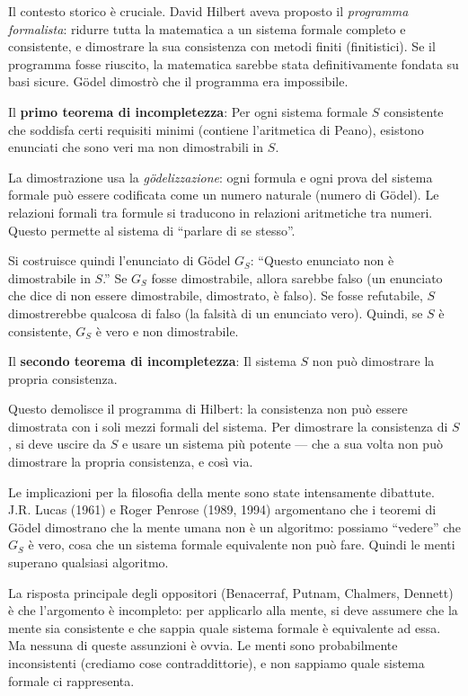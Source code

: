 \documentclass[11.5pt,a4paper,openany]{book}
\theoremstyle{remark}
\begin{document}
Il contesto storico è cruciale. David Hilbert aveva proposto il \textit{programma formalista}: ridurre tutta la matematica a un sistema formale completo e consistente, e dimostrare la sua consistenza con metodi finiti (finitistici). Se il programma fosse riuscito, la matematica sarebbe stata definitivamente fondata su basi sicure. Gödel dimostrò che il programma era impossibile.

Il \textbf{primo teorema di incompletezza}: Per ogni sistema formale $S$ consistente che soddisfa certi requisiti minimi (contiene l'aritmetica di Peano), esistono enunciati che sono veri ma non dimostrabili in $S$.

La dimostrazione usa la \textit{gödelizzazione}: ogni formula e ogni prova del sistema formale può essere codificata come un numero naturale (numero di Gödel). Le relazioni formali tra formule si traducono in relazioni aritmetiche tra numeri. Questo permette al sistema di ``parlare di se stesso''.

Si costruisce quindi l'enunciato di Gödel $G_S$: ``Questo enunciato non è dimostrabile in $S$.'' Se $G_S$ fosse dimostrabile, allora sarebbe falso (un enunciato che dice di non essere dimostrabile, dimostrato, è falso). Se fosse refutabile, $S$ dimostrerebbe qualcosa di falso (la falsità di un enunciato vero). Quindi, se $S$ è consistente, $G_S$ è vero e non dimostrabile.

Il \textbf{secondo teorema di incompletezza}: Il sistema $S$ non può dimostrare la propria consistenza.

Questo demolisce il programma di Hilbert: la consistenza non può essere dimostrata con i soli mezzi formali del sistema. Per dimostrare la consistenza di $S$, si deve uscire da $S$ e usare un sistema più potente --- che a sua volta non può dimostrare la propria consistenza, e così via.

Le implicazioni per la filosofia della mente sono state intensamente dibattute. J.R. Lucas (1961) e Roger Penrose (1989, 1994) argomentano che i teoremi di Gödel dimostrano che la mente umana non è un algoritmo: possiamo ``vedere'' che $G_S$ è vero, cosa che un sistema formale equivalente non può fare. Quindi le menti superano qualsiasi algoritmo.

La risposta principale degli oppositori (Benacerraf, Putnam, Chalmers, Dennett) è che l'argomento è incompleto: per applicarlo alla mente, si deve assumere che la mente sia consistente e che sappia quale sistema formale è equivalente ad essa. Ma nessuna di queste assunzioni è ovvia. Le menti sono probabilmente inconsistenti (crediamo cose contraddittorie), e non sappiamo quale sistema formale ci rappresenta.
\end{document}
